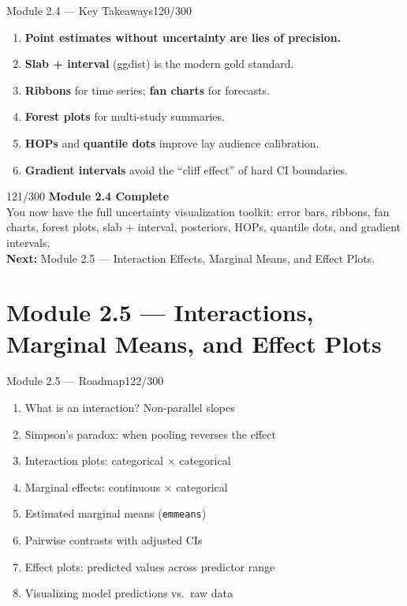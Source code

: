 \documentclass[10pt]{beamer}
\newcommand{\smark}[1]{\hfill{\scriptsize\color{codegray}#1}}
\begin{document}
\begin{frame}{Module 2.4 --- Key Takeaways}\smark{120/300}
\begin{enumerate}
    \item \textbf{Point estimates without uncertainty are lies of precision.}
    \item \textbf{Slab + interval} (ggdist) is the modern gold standard.
    \item \textbf{Ribbons} for time series; \textbf{fan charts} for forecasts.
    \item \textbf{Forest plots} for multi-study summaries.
    \item \textbf{HOPs} and \textbf{quantile dots} improve lay audience calibration.
    \item \textbf{Gradient intervals} avoid the ``cliff effect'' of hard CI boundaries.
\end{enumerate}
\end{frame}

\begin{frame}{}\smark{121/300}
\centering\vspace{1.5cm}
{\Large\textbf{Module 2.4 Complete}}\\[0.5cm]
You now have the full uncertainty visualization toolkit: error bars, ribbons, fan charts, forest plots, slab + interval, posteriors, HOPs, quantile dots, and gradient intervals.\\[0.5cm]
\textbf{Next:} Module 2.5 --- Interaction Effects, Marginal Means, and Effect Plots.
\end{frame}

\section{Module 2.5 --- Interactions, Marginal Means, and Effect Plots}

\begin{frame}{Module 2.5 --- Roadmap}\smark{122/300}
\begin{enumerate}
    \item What is an interaction? Non-parallel slopes
    \item Simpson's paradox: when pooling reverses the effect
    \item Interaction plots: categorical $\times$ categorical
    \item Marginal effects: continuous $\times$ categorical
    \item Estimated marginal means (\texttt{emmeans})
    \item Pairwise contrasts with adjusted CIs
    \item Effect plots: predicted values across predictor range
    \item Visualizing model predictions vs.\ raw data
\end{enumerate}
\end{frame}
\end{document}
